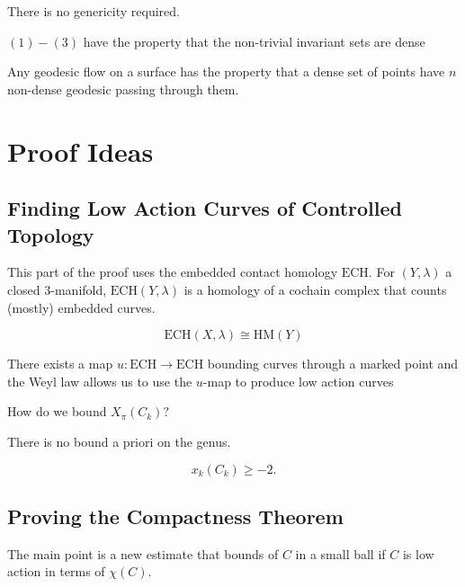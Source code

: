 \begin{remark}

There is no genericity required.

\end{remark}

\begin{corollary}

$(1)-(3)$ have the property that the non-trivial invariant sets are dense

\end{corollary}

\begin{corollary}

Any geodesic flow on a surface has the property that a dense set of points have $n$ non-dense geodesic passing through them.

\end{corollary}

\section{Proof Ideas}

\subsection{Finding Low Action Curves of Controlled Topology}

This part of the proof uses the embedded contact homology $\text{ECH}$. For $(Y, \lambda)$ a closed 3-manifold, $\text{ECH}(Y,\lambda)$ is a homology of a cochain complex that counts (mostly) embedded curves.

\begin{theorem}

\[
\text{ECH}(X, \lambda) \cong \text{HM}(Y)
\]

\end{theorem}

There exists a map $u: \text{ECH}\to \text{ECH}$ bounding curves through a marked point and the Weyl law allows us to use the $u$-map to produce low action curves

\begin{problem}

How do we bound $X_\pi(C_k)?$

\end{problem}

There is no bound a priori on the genus.

\begin{theorem}

\[
x_k(C_k)\ge -2.
\]

\end{theorem}

\subsection{Proving the Compactness Theorem}

The main point is a new estimate that bounds of $C$ in a small ball if $C$ is low action in terms of $\chi(C)$.